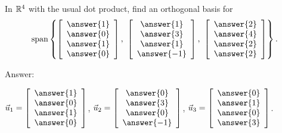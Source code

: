 \documentclass{ximera}
\begin{document}
\begin{problem}
  In $\mathbb{R}^4$ with the usual dot product, find an orthogonal basis for
  \begin{equation*}
    \sspan\set{
      \startmat{c} \answer{1} \\ \answer{0} \\ \answer{1} \\  \answer{0} \stopmat,~
      \startmat{c} \answer{1} \\ \answer{3} \\ \answer{1} \\ \answer{-1} \stopmat,~
      \startmat{c} \answer{2} \\ \answer{4} \\ \answer{2} \\  \answer{2} \stopmat
    }.
  \end{equation*}

  Answer:

    $\vect{u}_1 = \startmat{c} \answer{1} \\ \answer{0} \\ \answer{1} \\ \answer{0} \stopmat$,
    $\vect{u}_2 = \startmat{c} \answer{0} \\ \answer{3} \\ \answer{0} \\ \answer{-1} \stopmat$,
    $\vect{u}_3 = \startmat{c} \answer{0} \\ \answer{1} \\ \answer{0} \\ \answer{3} \stopmat$.

\end{problem}
\end{document}
